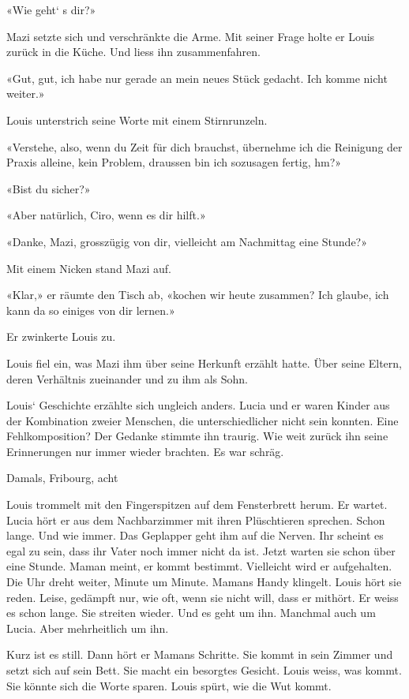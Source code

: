 «Wie geht` s dir?»

Mazi setzte sich und verschränkte die Arme. Mit seiner Frage holte er
Louis zurück in die Küche. Und liess ihn zusammenfahren.

«Gut, gut, ich habe nur gerade an mein neues Stück gedacht. Ich komme
nicht weiter.»

Louis unterstrich seine Worte mit einem Stirnrunzeln.

«Verstehe, also, wenn du Zeit für dich brauchst, übernehme ich die
Reinigung der Praxis alleine, kein Problem, draussen bin ich sozusagen
fertig, hm?»

«Bist du sicher?»

«Aber natürlich, Ciro, wenn es dir hilft.»

«Danke, Mazi, grosszügig von dir, vielleicht am Nachmittag eine Stunde?»

Mit einem Nicken stand Mazi auf.

«Klar,» er räumte den Tisch ab, «kochen wir heute zusammen? Ich glaube,
ich kann da so einiges von dir lernen.»

Er zwinkerte Louis zu.

Louis fiel ein, was Mazi ihm über seine Herkunft erzählt hatte. Über
seine Eltern, deren Verhältnis zueinander und zu ihm als Sohn.

Louis` Geschichte erzählte sich ungleich anders. Lucia und er waren
Kinder aus der Kombination zweier Menschen, die unterschiedlicher nicht
sein konnten. Eine Fehlkomposition? Der Gedanke stimmte ihn traurig. Wie
weit zurück ihn seine Erinnerungen nur immer wieder brachten. Es war
schräg.

Damals, Fribourg, acht

Louis trommelt mit den Fingerspitzen auf dem Fensterbrett herum. Er
wartet. Lucia hört er aus dem Nachbarzimmer mit ihren Plüschtieren
sprechen. Schon lange. Und wie immer. Das Geplapper geht ihm auf die
Nerven. Ihr scheint es egal zu sein, dass ihr Vater noch immer nicht da
ist. Jetzt warten sie schon über eine Stunde. Maman meint, er kommt
bestimmt. Vielleicht wird er aufgehalten. Die Uhr dreht weiter, Minute
um Minute. Mamans Handy klingelt. Louis hört sie reden. Leise, gedämpft
nur, wie oft, wenn sie nicht will, dass er mithört. Er weiss es schon
lange. Sie streiten wieder. Und es geht um ihn. Manchmal auch um Lucia.
Aber mehrheitlich um ihn.

Kurz ist es still. Dann hört er Mamans Schritte. Sie kommt in sein
Zimmer und setzt sich auf sein Bett. Sie macht ein besorgtes Gesicht.
Louis weiss, was kommt. Sie könnte sich die Worte sparen. Louis spürt,
wie die Wut kommt.

